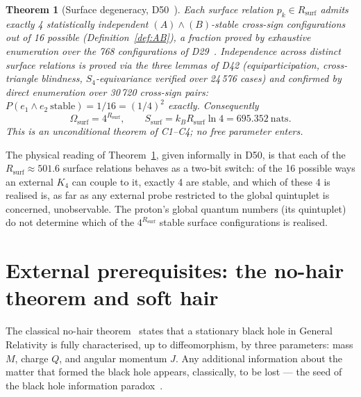 \documentclass[12pt,a4paper]{article}
\newtheorem{theorem}{Theorem}[section]
\newcommand{\Kfour}{K_4}
\newcommand{\Rsurf}{R_{\mathrm{surf}}}
\newcommand{\Omegasurf}{\Omega_{\mathrm{surf}}}
\newcommand{\Ssurf}{S_{\mathrm{surf}}}
\begin{document}
\begin{theorem}[Surface degeneracy, D50~\cite{PDL_D50_2026}]
\label{thm:D50}
Each surface relation $p_k \in \Rsurf$ admits exactly 4 statistically independent $(A)\wedge(B)$-stable cross-sign configurations out of 16 possible (Definition~\ref{def:AB}), a fraction proved by exhaustive enumeration over the 768 configurations of D29~\cite{PDL_D29_2026}. Independence across distinct surface relations is proved via the three lemmas of D42 (equiparticipation, cross-triangle blindness, $S_4$-equivariance verified over 24\,576 cases) and confirmed by direct enumeration over 30\,720 cross-sign pairs: $P(e_1\wedge e_2\ \mathrm{stable}) = 1/16 = (1/4)^2$ exactly. Consequently
\begin{equation}
\Omegasurf = 4^{\Rsurf}, \qquad \Ssurf = k_B \Rsurf \ln 4 = 695.352~\mathrm{nats}.
\end{equation}
This is an unconditional theorem of C1--C4; no free parameter enters.
\end{theorem}

The physical reading of Theorem~\ref{thm:D50}, given informally in D50, is that each of the $\Rsurf \approx 501.6$ surface relations behaves as a two-bit switch: of the 16 possible ways an external $\Kfour$ can couple to it, exactly 4 are stable, and which of these 4 is realised is, as far as any external probe restricted to the global quintuplet is concerned, unobservable. The proton's global quantum numbers (its quintuplet) do not determine which of the $4^{\Rsurf}$ stable surface configurations is realised.

\section{External prerequisites: the no-hair theorem and soft hair}
\label{sec:softhair}

The classical no-hair theorem~\cite{Israel1967,Carter1971} states that a stationary black hole in General Relativity is fully characterised, up to diffeomorphism, by three parameters: mass $M$, charge $Q$, and angular momentum $J$. Any additional information about the matter that formed the black hole appears, classically, to be lost --- the seed of the black hole information paradox~\cite{Hawking1975,Hawking1976}.
\end{document}

